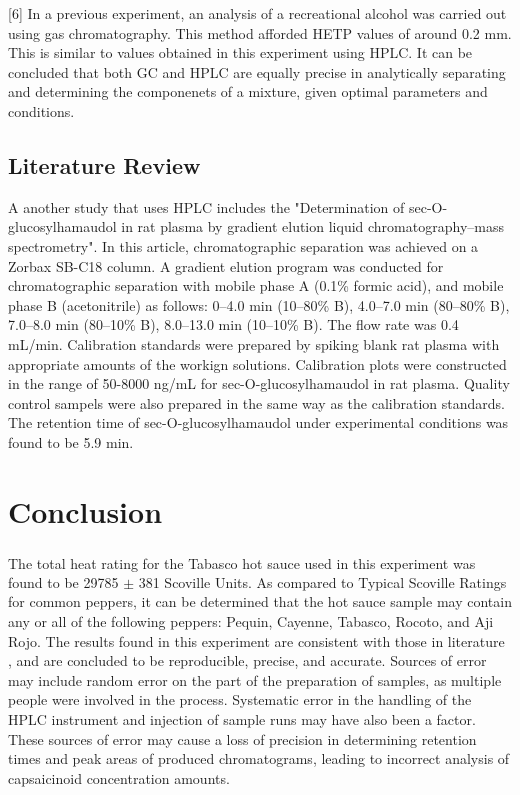 \documentclass{article}
\begin{document}
\begin{multicols}{2}
{[6] In a previous experiment, an analysis of a recreational alcohol was carried
out using gas chromatography. This method afforded HETP values of around 0.2 mm.
This is similar to values obtained in this experiment using HPLC. It can be
concluded that both GC and HPLC are equally precise in analytically separating
and determining the componenets of a mixture, given optimal parameters and
conditions.


\subsection*{Literature Review}
A another study that uses HPLC includes the "Determination of
sec-O-glucosylhamaudol in rat plasma by gradient elution liquid
chromatography–mass spectrometry".\cite{rat}
In this article, chromatographic separation was achieved on a Zorbax SB-C18
column.
A gradient elution program was conducted for chromatographic separation with
mobile phase A (0.1\% formic acid), and mobile phase B (acetonitrile) as follows:
0–4.0 min (10–80\% B), 4.0–7.0 min (80–80\% B), 7.0–8.0 min (80–10\% B), 8.0–13.0
min (10–10\% B).
The flow rate was 0.4 mL/min.
Calibration standards were prepared by spiking blank rat plasma with appropriate
amounts of the workign solutions. Calibration plots were constructed in the
range of 50-8000 ng/mL for sec-O-glucosylhamaudol in rat plasma.
Quality control sampels were also prepared in the same way as the calibration
standards.
The retention time of sec-O-glucosylhamaudol under experimental conditions was
found to be 5.9 min.

\section*{Conclusion}
The total heat rating for the Tabasco\textsuperscript{\textregistered} hot sauce
used in this experiment was found to be 29785 $\pm$ 381 Scoville Units. As
compared to Typical Scoville Ratings for common peppers\cite{lab_man}, it can be determined
that the hot sauce sample may contain any or all of the following peppers:
Pequin, Cayenne, Tabasco, Rocoto, and Aji Rojo.
The results found in this experiment are consistent with those in literature
\cite{lab_man},
and are concluded to be reproducible, precise, and accurate. 
Sources of error may include random error on the part of the preparation of
samples, as multiple people were involved in the process. Systematic error in
the handling of the HPLC instrument and injection of sample runs may have also
been a factor. These sources of error may cause a loss of precision in
determining retention times and peak areas of produced chromatograms, leading to
incorrect analysis of capsaicinoid concentration amounts.




}
\end{multicols}
\end{document}
